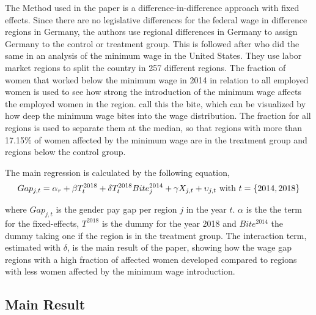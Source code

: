 \documentclass[12pt,draft,a4paper]{article}
\begin{document}

The Method used in the paper is a difference-in-difference approach with fixed effects. 
Since there are no legislative differences for the federal wage in difference regions in Germany, the authors use regional differences in Germany to assign Germany to the control or treatment group.
This is followed after \citet{Card1992} who did the same in an analysis of the minimum wage in the United States. 
They  use labor market regions to split the country in 257 different regions. 
The fraction of women that worked below the minimum wage in 2014 in relation to all employed women is used to see how 
strong %
the introduction of the minimum wage affects the employed women in the region. 
 call this the bite, which can be visualized by how deep the minimum wage bites into the wage distribution.
The fraction for all regions is used to separate them at the median, so that regions with more than 17.15\% of women affected by the minimum wage are in the treatment group and regions below the control group.

The main regression is calculated by the following equation,
\begin{equation}\label{equ:main}
    Gap_{j,t} = \alpha_r + \beta T_{t}^{2018} + \delta T_{t}^{2018} Bite_{j}^{2014} + \gamma X_{j,t} + \upsilon_{j,t} \textnormal{ with } t =\{2014, 2018\} 
\end{equation}

where $Gap_{j,t}$ is the gender pay gap per region $j$ in the year $t$. $ \alpha$ is the the term for the fixed-effects, $T^{2018}$ is the dummy for the year 2018 and $Bite^{2014}$ the dummy taking one if the region is in the treatment group.
The interaction term, estimated with $\delta$, is the main result of the paper, showing how the wage gap regions with a high fraction of affected women developed compared to regions with less women affected by the minimum wage introduction.

\subsection{Main Result}
\end{document}
